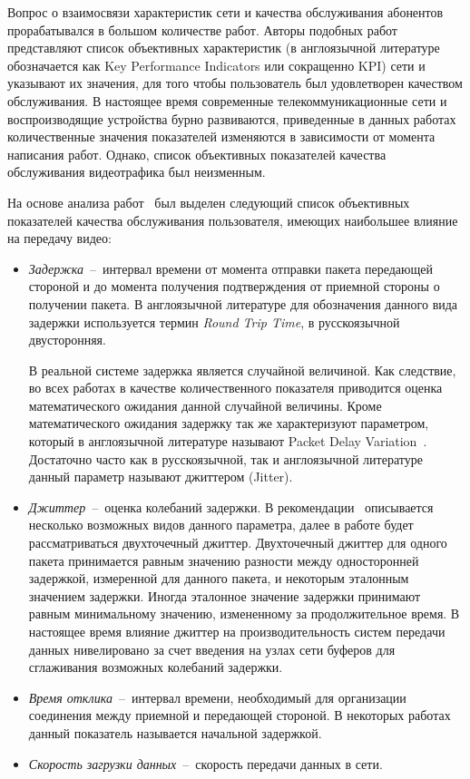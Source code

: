 Вопрос о взаимосвязи характеристик сети и качества обслуживания абонентов прорабатывался в большом количестве работ. Авторы подобных работ представляют список объективных характеристик (в англоязычной литературе обозначается как Key Performance Indicators или сокращенно KPI) сети и указывают их значения, для того чтобы пользователь был удовлетворен качеством обслуживания. В настоящее время современные телекоммуникационные сети и воспроизводящие устройства бурно развиваются, приведенные в данных работах количественные значения показателей изменяются в зависимости от момента написания работ. Однако, список объективных показателей качества обслуживания видеотрафика был неизменным.

На основе анализа работ~\cite{Chen,Cacheda2007,HuaweiReport} был выделен следующий список объективных показателей качества обслуживания пользователя, имеющих наибольшее влияние на передачу видео:
\begin{itemize}
  \item \textit{Задержка}~--~интервал времени от момента отправки пакета передающей стороной и до момента получения подтверждения от приемной стороны о получении пакета. В англоязычной литературе для обозначения данного вида задержки используется термин \textit{Round Trip Time}, в русскоязычной двусторонняя.

  В реальной системе задержка является случайной величиной. Как следствие, во всех работах в качестве количественного показателя приводится оценка математического ожидания данной случайной величины. Кроме математического ожидания задержку так же характеризуют параметром, который в англоязычной литературе называют Packet Delay Variation~\cite{Jitter}. Достаточно часто как в русскоязычной, так и англоязычной литературе данный параметр называют джиттером (Jitter).
  \item \textit{Джиттер}~--~оценка колебаний задержки. В рекомендации~\cite{Jitter} описывается несколько возможных видов данного параметра, далее в работе будет рассматриваться двухточечный джиттер. Двухточечный джиттер для одного пакета принимается равным значению разности между односторонней задержкой, измеренной для данного пакета, и некоторым эталонным значением задержки. Иногда эталонное значение задержки принимают равным минимальному значению, измененному за продолжительное время. В настоящее время влияние джиттер на производительность систем передачи данных нивелировано за счет введения на узлах сети буферов для сглаживания возможных колебаний задержки.
  \item \textit{Время отклика}~--~интервал времени, необходимый для организации соединения между приемной и передающей стороной. В некоторых работах данный показатель называется начальной задержкой.
  \item \textit{Скорость загрузки данных}~--~скорость передачи данных в сети.
\end{itemize}

